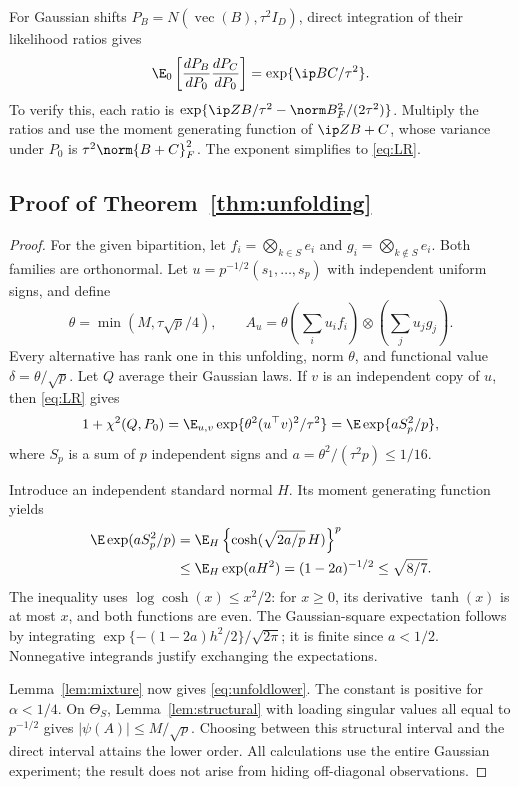 For Gaussian shifts $P_B=N(\operatorname{vec}(B),\tau^2I_D)$, direct integration of their likelihood ratios gives
\begin{equation}\label{eq:LR}
 \E_0\left[\frac{dP_B}{dP_0}\frac{dP_C}{dP_0}\right]
 =\exp\{\ip BC/\tau^2\}.
\end{equation}
To verify this, each ratio is $\exp\{\ip ZB/\tau^2-\norm B_F^2/(2\tau^2)\}$. Multiply the ratios and use the moment generating function of $\ip Z{B+C}$, whose variance under $P_0$ is $\tau^2\norm{B+C}_F^2$. The exponent simplifies to \eqref{eq:LR}.

\subsection{Proof of Theorem~\ref{thm:unfolding}}

\begin{proof}
For the given bipartition, let $f_i=\bigotimes_{k\in S}e_i$ and $g_i=\bigotimes_{k\notin S}e_i$. Both families are orthonormal. Let $u=p^{-1/2}(s_1,\ldots,s_p)$ with independent uniform signs, and define
\[
 \theta=\min(M,\tau\sqrt p/4),\qquad
 A_u=\theta\left(\sum_i u_i f_i\right)\otimes
                    \left(\sum_j u_j g_j\right).
\]
Every alternative has rank one in this unfolding, norm $\theta$, and functional value $\delta=\theta/\sqrt p$. Let $Q$ average their Gaussian laws. If $v$ is an independent copy of $u$, then \eqref{eq:LR} gives
\[
 1+\chi^2(Q,P_0)=\E_{u,v}\exp\{\theta^2(u^\top v)^2/\tau^2\}
 =\E\exp\{a S_p^2/p\},
\]
where $S_p$ is a sum of $p$ independent signs and $a=\theta^2/(\tau^2p)\le1/16$.

Introduce an independent standard normal $H$. Its moment generating function yields
\begin{align*}
 \E\exp(aS_p^2/p)
 &=\E_H\left\{\cosh(\sqrt{2a/p}\,H)\right\}^p\\
 &\le\E_H\exp(aH^2)=(1-2a)^{-1/2}\le\sqrt{8/7}.
\end{align*}
The inequality uses $\log\cosh(x)\le x^2/2$: for $x\ge0$, its derivative $\tanh(x)$ is at most $x$, and both functions are even. The Gaussian-square expectation follows by integrating $\exp\{-(1-2a)h^2/2\}/\sqrt{2\pi}$; it is finite since $a<1/2$. Nonnegative integrands justify exchanging the expectations.

Lemma~\ref{lem:mixture} now gives \eqref{eq:unfoldlower}. The constant is positive for $\alpha<1/4$. On $\Theta_S$, Lemma~\ref{lem:structural} with loading singular values all equal to $p^{-1/2}$ gives $|\psi(A)|\le M/\sqrt p$. Choosing between this structural interval and the direct interval attains the lower order. All calculations use the entire Gaussian experiment; the result does not arise from hiding off-diagonal observations.
\end{proof}

